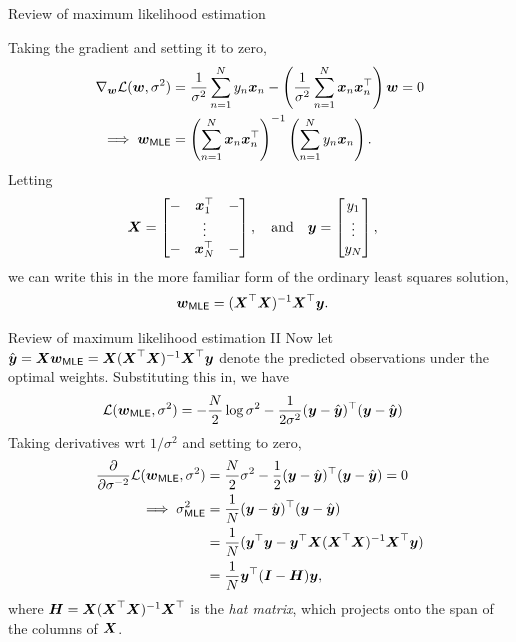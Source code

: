 \documentclass[aspectratio=169]{beamer}
\begin{document}
\begin{frame}{Review of maximum likelihood estimation}

Taking the gradient and setting it to zero,
\begin{align}
    \nabla_{\boldsymbol{w}} \mathcal{L}(\boldsymbol{w}, \sigma^2) &= \frac{1}{\sigma^2} \sum_{n=1}^N y_n \boldsymbol{x}_n - \left( \frac{1}{\sigma^2}\sum_{n=1}^N \boldsymbol{x}_n \boldsymbol{x}_n^\top \right) \boldsymbol{w} = 0 \\
    \implies \boldsymbol{w}_{\mathsf{MLE}} &= \left(\sum_{n=1}^N \boldsymbol{x}_n \boldsymbol{x}_n^\top \right)^{-1} \left( \sum_{n=1}^N y_n \boldsymbol{x}_n \right).
\end{align}
Letting 
\begin{align}
    \boldsymbol{X} = \begin{bmatrix} - & \boldsymbol{x}_1^\top & - \\ & \vdots & \\ - & \boldsymbol{x}_N^\top & - \end{bmatrix}, \quad \text{and} \quad  &
    \boldsymbol{y} = \begin{bmatrix} y_1 \\ \vdots \\ y_N \end{bmatrix},
\end{align}
we can write this in the more familiar form of the ordinary least squares solution,
\begin{align}
    \boldsymbol{w}_{\mathsf{MLE}} &= (\boldsymbol{X}^\top \boldsymbol{X})^{-1} \boldsymbol{X}^\top \boldsymbol{y}.
\end{align}
\end{frame}

\begin{frame}{Review of maximum likelihood estimation II}
Now let $\hat{\boldsymbol{y}} = \boldsymbol{X} \boldsymbol{w}_{\mathsf{MLE}} = \boldsymbol{X} (\boldsymbol{X}^\top \boldsymbol{X})^{-1} \boldsymbol{X}^\top \boldsymbol{y}$ denote the predicted observations under the optimal weights. Substituting this in, we have
\begin{align}
    \mathcal{L}(\boldsymbol{w}_{\mathsf{MLE}}, \sigma^2) &= -\frac{N}{2} \log \sigma^2 -\frac{1}{2\sigma^2} (\boldsymbol{y} - \hat{\boldsymbol{y}})^\top (\boldsymbol{y} - \hat{\boldsymbol{y}})
\end{align}
Taking derivatives wrt $1/\sigma^2$ and setting to zero,
\begin{align}
    \frac{\partial}{\partial \sigma^{-2}} \mathcal{L}(\boldsymbol{w}_{\mathsf{MLE}}, \sigma^2) 
    &= \frac{N}{2} \sigma^2 - \frac{1}{2} (\boldsymbol{y} - \hat{\boldsymbol{y}})^\top (\boldsymbol{y} - \hat{\boldsymbol{y}}) = 0 \\
    \implies \sigma^2_{\mathsf{MLE}} &= \frac{1}{N} (\boldsymbol{y} - \hat{\boldsymbol{y}})^\top (\boldsymbol{y} - \hat{\boldsymbol{y}}) \\
    &= \frac{1}{N} ( \boldsymbol{y}^\top \boldsymbol{y} - \boldsymbol{y}^\top \boldsymbol{X} (\boldsymbol{X}^\top \boldsymbol{X})^{-1} \boldsymbol{X}^\top \boldsymbol{y} ) \\
    &= \frac{1}{N}\boldsymbol{y}^\top (\boldsymbol{I} - \boldsymbol{H}) \boldsymbol{y},
\end{align}
where $\boldsymbol{H} = \boldsymbol{X} (\boldsymbol{X}^\top \boldsymbol{X})^{-1} \boldsymbol{X}^\top$ is the \emph{hat matrix}, which projects onto the span of the columns of $\boldsymbol{X}$.
\end{frame}
\end{document}
